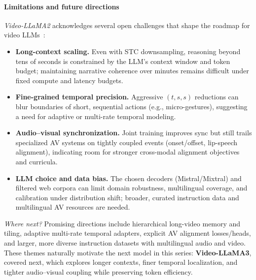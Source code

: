 \begin{enrichment}
\begin{enrichment}
        \paragraph{Limitations and future directions}
        \label{par:chapter24_videollama2_limits}
        \emph{Video\mbox{-}LLaMA2} acknowledges several open challenges that shape the roadmap for video LLMs~\cite[Sec.~3--5]{cheng2024_videollama2}:
        \begin{itemize}
            \item \textbf{Long\mbox{-}context scaling.} Even with STC downsampling, reasoning beyond tens of seconds is constrained by the LLM’s context window and token budget; maintaining narrative coherence over minutes remains difficult under fixed compute and latency budgets.
            \item \textbf{Fine\mbox{-}grained temporal precision.} Aggressive \((t,s,s)\) reductions can blur boundaries of short, sequential actions (e.g., micro\mbox{-}gestures), suggesting a need for adaptive or multi\mbox{-}rate temporal modeling.
            \item \textbf{Audio--visual synchronization.} Joint training improves sync but still trails specialized AV systems on tightly coupled events (onset/offset, lip\mbox{-}speech alignment), indicating room for stronger cross\mbox{-}modal alignment objectives and curricula.
            \item \textbf{LLM choice and data bias.} The chosen decoders (Mistral/Mixtral) and filtered web corpora can limit domain robustness, multilingual coverage, and calibration under distribution shift; broader, curated instruction data and multilingual AV resources are needed.
        \end{itemize}
        \textit{Where next?} Promising directions include hierarchical long\mbox{-}video memory and tiling, adaptive multi\mbox{-}rate temporal adapters, explicit AV alignment losses/heads, and larger, more diverse instruction datasets with multilingual audio and video. These themes naturally motivate the next model in this series: \textbf{Video\mbox{-}LLaMA3}, covered next, which explores longer contexts, finer temporal localization, and tighter audio--visual coupling while preserving token efficiency.
        

\end{enrichment}
\end{enrichment}
